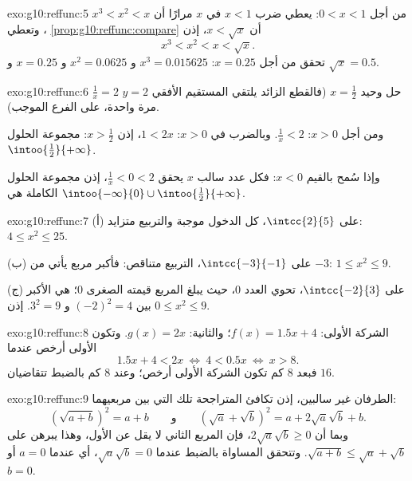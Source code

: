 \begin{solution}{exo:g10:reffunc:5}
من أجل $0 < x < 1$: يعطي ضرب $x < 1$ في $x$ مرارًا أن
$x^3 < x^2 < x$، وتعطي \cref{prop:g10:reffunc:compare} أن $x < \sqrt x$،
إذن
\[
x^3 < x^2 < x < \sqrt x .
\]
تحقق من أجل $x = 0.25$: $x^3 = 0.015625$ و $x^2 = 0.0625$ و $x = 0.25$ و
$\sqrt x = 0.5$.
\end{solution}

\begin{solution}{exo:g10:reffunc:6}
 $\frac1x = 2$ حل وحيد $x = \frac12$ (فالقطع الزائد يلتقي
المستقيم الأفقي $y = 2$ مرة واحدة، على الفرع الموجب).

ومن أجل $x > 0$: $\frac1x < 2$. وبالضرب في $x > 0$: $1 < 2x$، إذن
$x > \frac12$: مجموعة الحلول $\intoo{\frac12}{+\infty}$.

وإذا سُمح بالقيم $x < 0$: فكل عدد سالب $x$ يحقق $\frac1x < 0 < 2$،
إذن مجموعة الحلول الكاملة هي
$\intoo{-\infty}{0} \cup \intoo{\frac12}{+\infty}$.
\end{solution}

\begin{solution}{exo:g10:reffunc:7}
(أ) على $\intcc{2}{5}$، كل الدخول موجبة والتربيع متزايد:
$4 \leq x^2 \leq 25$.

(ب) على $\intcc{-3}{-1}$، التربيع متناقص:
فأكبر مربع يأتي من $-3$: $1 \leq x^2 \leq 9$.

(ج) على $\intcc{-2}{3}$، تحوي  العدد $0$، حيث يبلغ المربع
قيمته الصغرى $0$؛  هي الأكبر بين $(-2)^2 = 4$ و
$3^2 = 9$. إذن $0 \leq x^2 \leq 9$.
\end{solution}

\begin{solution}{exo:g10:reffunc:8}
الشركة الأولى: $f(x) = 1.5x + 4$؛ والثانية: $g(x) = 2x$. وتكون الأولى
أرخص عندما
\[
1.5x + 4 < 2x
\ \Longleftrightarrow\
4 < 0.5x
\ \Longleftrightarrow\
x > 8 .
\]
فبعد $8$ كم تكون الشركة الأولى أرخص؛ وعند $8$ كم بالضبط تتقاضيان
$16$.
\end{solution}

\begin{solution}{exo:g10:reffunc:9}
الطرفان غير سالبين، إذن تكافئ المتراجحة تلك التي
بين مربعيهما:
\[
\left(\sqrt{a+b}\right)^2 = a + b
\qquad\text{و}\qquad
\left(\sqrt a + \sqrt b\right)^2 = a + 2\sqrt a \sqrt b + b .
\]
وبما أن $2\sqrt a\sqrt b \geq 0$، فإن المربع الثاني لا يقل عن الأول،
وهذا يبرهن على $\sqrt{a+b} \leq \sqrt a + \sqrt b$. وتتحقق المساواة بالضبط
عندما $\sqrt a \sqrt b = 0$، أي عندما $a = 0$ أو $b = 0$.
\end{solution}

